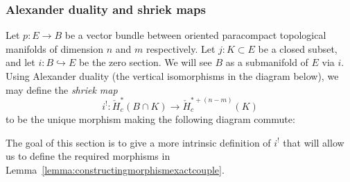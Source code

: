 \documentclass[a4paper]{amsart}
\theoremstyle{plain}
\theoremstyle{definition}
\newcommand{\CCH}{\check{H}_{c}}
\begin{document}
\subsubsection{Alexander duality and shriek maps}

Let $p \colon E \to B$ be a vector bundle between oriented paracompact topological manifolds of dimension $n$ and $m$ respectively. Let $j \colon K \subset E$ be a closed subset, and let $i \colon B \hookrightarrow E$ be the zero section. We will see $B$ as a submanifold of $E$ via $i$. Using Alexander duality (the vertical isomorphisms in the diagram below), we may define the \emph{shriek map}
\begin{equation}\label{eqn:generalshriekmap}
    i^! \colon \CCH^*(B \cap K) \to \CCH^{*+(n-m)}(K)
\end{equation}
to be the unique morphism making the following diagram commute:
\begin{center}
\end{center}
The goal of this section is to give a more intrinsic definition of $i^!$ that will allow us to define the required morphisms in Lemma~\ref{lemma:constructingmorphismexactcouple}.

\bigskip
\end{document}
